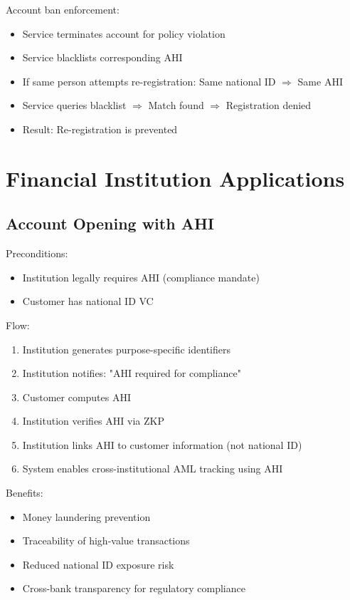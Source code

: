 Account ban enforcement:
\begin{itemize}
  \item Service terminates account for policy violation
  \item Service blacklists corresponding AHI
  \item If same person attempts re-registration: Same national ID $\Rightarrow$ Same AHI
  \item Service queries blacklist $\Rightarrow$ Match found $\Rightarrow$ Registration denied
  \item Result: Re-registration is prevented
\end{itemize}

\section{Financial Institution Applications}

\subsection{Account Opening with AHI}

Preconditions:
\begin{itemize}
  \item Institution legally requires AHI (compliance mandate)
  \item Customer has national ID VC
\end{itemize}

Flow:
\begin{enumerate}
  \item Institution generates purpose-specific identifiers
  \item Institution notifies: "AHI required for compliance"
  \item Customer computes AHI
  \item Institution verifies AHI via ZKP
  \item Institution links AHI to customer information (not national ID)
  \item System enables cross-institutional AML tracking using AHI
\end{enumerate}

Benefits:
\begin{itemize}
  \item Money laundering prevention
  \item Traceability of high-value transactions
  \item Reduced national ID exposure risk
  \item Cross-bank transparency for regulatory compliance
\end{itemize}

